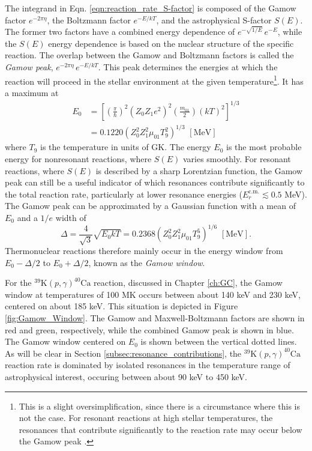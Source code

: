 The integrand in Eqn. \ref{eqn:reaction_rate_S-factor} is composed of the Gamow factor $e^{-2 \pi \eta}$, the Boltzmann factor $e^{-E/kT}$, and the astrophysical S-factor $S(E)$. The former two factors have a combined energy dependence of $e^{-\sqrt{1/E}} \, e^{-E}$, while the $S(E)$ energy dependence is based on the nuclear structure of the specific reaction. The overlap between the Gamow and Boltzmann factors is called the \emph{Gamow peak}, $e^{-2 \pi \eta} \, e^{-E/kT}$. This peak determines the energies at which the reaction will proceed in the stellar environment at the given temperature\footnote{This is a slight oversimplification, since there is a circumstance where this is not the case. For resonant reactions at high stellar temperatures, the resonances that contribute significantly to the reaction rate may occur below the Gamow peak \cite{Iliadis2015}.}. It has a maximum at
\begin{align}
E_{0} &= \left[ \left(\frac{\pi}{\hbar}\right)^{2} (Z_{0} Z_{1} e^{2})^{2} \left(\frac{m_{01}}{2}\right) (kT)^{2} \right]^{1/3} \nonumber \\
&= 0.1220 \left(Z_{0}^{2} Z_{1}^{2} \mu_{01} T_{9}^{2} \right)^{1/3} \,\, [\mathrm{MeV}]
\end{align}
where $T_{9}$ is the temperature in units of GK. The energy $E_{0}$ is the most probable energy for nonresonant reactions, where $S(E)$ varies smoothly. For resonant reactions, where $S(E)$ is described by a sharp Lorentzian function, the Gamow peak can still be a useful indicator of which resonances contribute significantly to the total reaction rate, particularly at lower resonance energies ($E_{r}^{\mathrm{c.m.}} \lesssim 0.5$ MeV). The Gamow peak can be approximated by a Gaussian function with a mean of $E_{0}$ and a $1/e$ width of
\begin{equation}
\Delta = \frac{4}{\sqrt{3}} \sqrt{E_{0} k T} = 0.2368 \left(Z_{0}^{2} Z_{1}^{2} \mu_{01} T_{9}^{5}\right)^{1/6} \,\, [\mathrm{MeV}].
\end{equation}
Thermonuclear reactions therefore mainly occur in the energy window from $E_{0} - \Delta/2$ to $E_{0} + \Delta/2$, known as the \emph{Gamow window}.

For the $^{39}\mathrm{K}(p,\gamma)^{40}\mathrm{Ca}$ reaction, discussed in Chapter \ref{ch:GC}, the Gamow window at temperatures of 100 MK occurs between about 140 keV and 230 keV, centered on about 185 keV. This situation is depicted in Figure \ref{fig:Gamow_Window}. The Gamow and Maxwell-Boltzmann factors are shown in red and green, respectively, while the combined Gamow peak is shown in blue. The Gamow window centered on $E_{0}$ is shown between the vertical dotted lines. As will be clear in Section \ref{subsec:resonance_contributions}, the $^{39}\mathrm{K}(p,\gamma)^{40}\mathrm{Ca}$ reaction rate is dominated by isolated resonances in the temperature range of astrophysical interest, occuring between about 90 keV to 450 keV.


